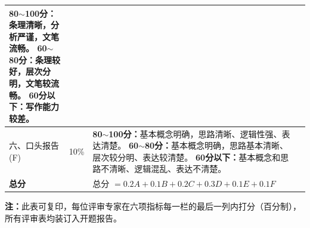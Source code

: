 \documentclass[UTF8, a4paper, zihao=-4, fontset=mac]{ctexart}
\begin{document}
{\begin{tabularx}{\textwidth}{|p{2.4cm}|c|X|c|}
\textbf{80$\sim$100分：}条理清晰，分析严谨，文笔流畅。
\textbf{60$\sim$80分：}条理较好，层次分明，文笔较流畅。
\textbf{60分以下：}写作能力较差。 & \\
\hline
\makecell[l]{六、口头报告\\(F)} & 10\% &
\textbf{80$\sim$100分：}基本概念明确，思路清晰、逻辑性强、表达清楚。
\textbf{60$\sim$80分：}基本概念明确，思路基本清晰、层次较分明、表达较清楚。
\textbf{60分以下：}基本概念和思路不清晰、逻辑混乱、表达不清楚。 & \\
\hline
\textbf{总分} & & \multicolumn{2}{l|}{总分 $= 0.2A + 0.1B + 0.2C + 0.3D + 0.1E + 0.1F$} \\
\hline
\end{tabularx}

\vspace{0.5cm}

\textbf{注：}此表可复印，每位评审专家在六项指标每一栏的最后一列内打分（百分制），所有评审表均装订入开题报告。
}
\end{document}
